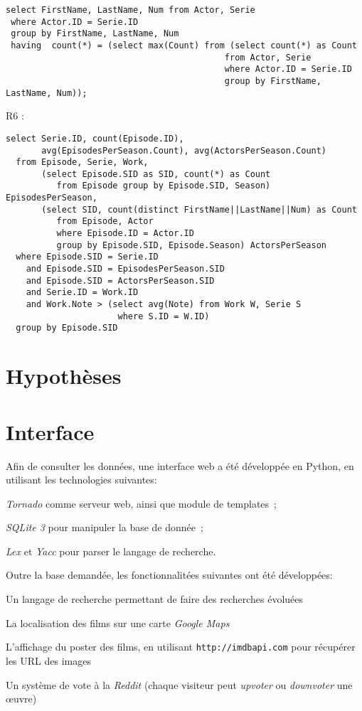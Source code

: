 \documentclass[a4paper,12pt]{article}
\begin{document}
\begin{list}{-}{}
    \begin{lstlisting}
select FirstName, LastName, Num from Actor, Serie
 where Actor.ID = Serie.ID
 group by FirstName, LastName, Num
 having  count(*) = (select max(Count) from (select count(*) as Count
                                           from Actor, Serie
                                           where Actor.ID = Serie.ID
                                           group by FirstName, LastName, Num));
    \end{lstlisting}
  \item R6 :
    \begin{lstlisting}
select Serie.ID, count(Episode.ID), 
       avg(EpisodesPerSeason.Count), avg(ActorsPerSeason.Count)
  from Episode, Serie, Work,
       (select Episode.SID as SID, count(*) as Count
          from Episode group by Episode.SID, Season) EpisodesPerSeason,
       (select SID, count(distinct FirstName||LastName||Num) as Count
          from Episode, Actor
          where Episode.ID = Actor.ID
          group by Episode.SID, Episode.Season) ActorsPerSeason
  where Episode.SID = Serie.ID
    and Episode.SID = EpisodesPerSeason.SID
    and Episode.SID = ActorsPerSeason.SID
    and Serie.ID = Work.ID
    and Work.Note > (select avg(Note) from Work W, Serie S
                      where S.ID = W.ID)
  group by Episode.SID
\end{lstlisting}
\section{Hypothèses}
\section{Interface}
Afin de consulter les données, une interface web a été développée en
Python, en utilisant les technologies suivantes:
\begin{list}{-}{}
  \item \emph{Tornado} comme serveur web, ainsi que module de templates~;
  \item \emph{SQLite 3} pour manipuler la base de donnée~;
  \item \emph{Lex} et \emph{Yacc} pour parser le langage de recherche.
\end{list}

Outre la base demandée, les fonctionnalitées suivantes ont été développées:
\begin{list}{-}{}
  \item Un langage de recherche permettant de faire des recherches évoluées
  \item La localisation des films sur une carte \emph{Google Maps}
  \item L'affichage du poster des films, en utilisant
    \texttt{http://imdbapi.com} pour récupérer les URL des images
  \item Un système de vote à la \emph{Reddit} (chaque visiteur peut
    \emph{upvoter} ou \emph{downvoter} une œuvre)
\end{list}

\end{list}
\end{document}
